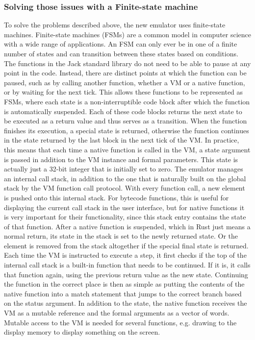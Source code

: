 
\subsubsection{Solving those issues with a Finite-state machine}
To solve the problems described above, the new emulator uses finite-state machines.
Finite-state machines (FSMs) are a common model in computer science with a wide range of applications. An FSM can only ever be in one of a finite number of states and can transition between these states based on conditions.
The functions in the Jack standard library do not need to be able to pause at any point in the code. Instead, there are distinct points at which the function can be paused, such as by calling another function, whether a VM or a native function, or by waiting for the next tick.
This allows these functions to be represented as FSMs, where each state is a non-interruptible code block after which the function is automatically suspended. Each of these code blocks returns the next state to be executed as a return value and thus serves as a transition.
When the function finishes its execution, a special state is returned, otherwise the function continues in the state returned by the last block in the next tick of the VM.
In practice, this means that each time a native function is called in the VM, a state argument is passed in addition to the VM instance and formal parameters.
This state is actually just a 32-bit integer that is initially set to zero.
The emulator manages an internal call stack, in addition to the one that is naturally built on the global stack by the VM function call protocol.
With every function call, a new element is pushed onto this internal stack. For bytecode functions, this is useful for displaying the current call stack in the user interface, but for native functions it is very important for their functionality, since this stack entry contains the state of that function.
After a native function is suspended, which in Rust just means a normal return, its state in the stack is set to the newly returned state. Or the element is removed from the stack altogether if the special final state is returned.
Each time the VM is instructed to execute a step, it first checks if the top of the internal call stack is a built-in function that needs to be continued. If it is, it calls that function again, using the previous return value as the new state.
Continuing the function in the correct place is then as simple as putting the contents of the native function into a match statement that jumps to the correct branch based on the status argument.
In addition to the state, the native function receives the VM as a mutable reference and the formal arguments as a vector of words.
Mutable access to the VM is needed for several functions, e.g. drawing to the display memory to display something on the screen.


